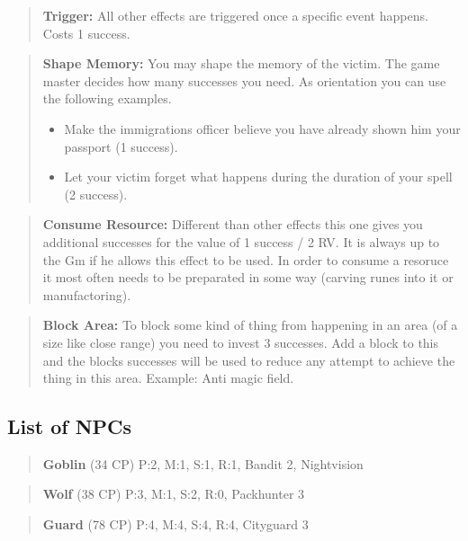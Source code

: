\documentclass[11pt]{article}
\begin{document}
{\begin{multicols}{2}[]
\begin{quote}
\textbf{Trigger:} All other effects are triggered once a specific event happens. Costs 1 success. 
\end{quote}

\begin{quote}
\textbf{Shape Memory:} You may shape the memory of the victim. The game master decides how many successes you need. As orientation you can use the following examples.
\begin{itemize}
\item Make the immigrations officer believe you have already shown him your passport (1 success).
\item Let your victim forget what happens during the duration of your spell (2 success).
\end{itemize}
\end{quote}

\begin{quote}
\textbf{Consume Resource:} Different than other effects this one gives you additional successes for the value of 1 success / 2 RV. It is always up to the Gm if he allows this effect to be used. In order to consume a resoruce it most often needs to be preparated in some way (carving runes into it or manufactoring).
\end{quote}

\begin{quote}
\textbf{Block Area:} To block some kind of thing from happening in an area (of a size like close range) you need to invest 3 successes. Add a block to this and the blocks successes will be used to reduce any attempt to achieve the thing in this area.
Example: Anti magic field.
\end{quote}



\subsection{List of NPCs}
\label{sec:org318ed2a}
\begin{quote}
\textbf{Goblin} (34 CP)
P:2, M:1, S:1, R:1, Bandit 2, Nightvision
\end{quote}

\begin{quote}
\textbf{Wolf} (38 CP)
P:3, M:1, S:2, R:0, Packhunter 3
\end{quote}

\begin{quote}
\textbf{Guard} (78 CP)
P:4, M:4, S:4, R:4, Cityguard 3
\end{quote}


\end{multicols}}
\end{document}
